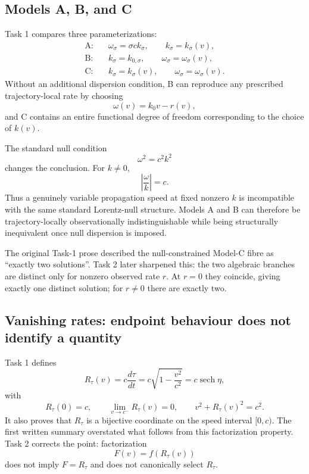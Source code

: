 \documentclass[11pt,a4paper]{article}
\newcommand{\sech}{\operatorname{sech}}
\begin{document}
\subsection{Models A, B, and C}

Task 1 compares three parameterizations:
\begin{align}
\text{A:}\quad & \omega_\sigma=\sigma ck_\sigma,\qquad k_\sigma=k_\sigma(v),\\
\text{B:}\quad & k_\sigma=k_{0,\sigma},\qquad \omega_\sigma=\omega_\sigma(v),\\
\text{C:}\quad & k_\sigma=k_\sigma(v),\qquad \omega_\sigma=\omega_\sigma(v).
\end{align}
Without an additional dispersion condition, B can reproduce any prescribed trajectory-local rate by choosing
\begin{equation}
 \omega(v)=k_0v-r(v),
\end{equation}
and C contains an entire functional degree of freedom corresponding to the choice of $k(v)$.

The standard null condition
\begin{equation}
 \omega^2=c^2k^2
\label{eq:dispersion}
\end{equation}
changes the conclusion.  For $k\neq0$,
\begin{equation}
 \left|\frac{\omega}{k}\right|=c.
\end{equation}
Thus a genuinely variable propagation speed at fixed nonzero $k$ is incompatible with the same standard Lorentz-null structure.  Models A and B can therefore be trajectory-locally observationally indistinguishable while being structurally inequivalent once null dispersion is imposed.

The original Task-1 prose described the null-constrained Model-C fibre as ``exactly two solutions''.  Task 2 later sharpened this: the two algebraic branches are distinct only for nonzero observed rate $r$.  At $r=0$ they coincide, giving exactly one distinct solution; for $r\neq0$ there are exactly two.

\subsection{Vanishing rates: endpoint behaviour does not identify a quantity}

Task 1 defines
\begin{equation}
 R_\tau(v)=c\frac{d\tau}{dt}=c\sqrt{1-\frac{v^2}{c^2}}=c\sech\eta,
\end{equation}
with
\begin{equation}
 R_\tau(0)=c,
 \qquad
 \lim_{v\to c^-}R_\tau(v)=0,
 \qquad
 v^2+R_\tau(v)^2=c^2.
\end{equation}
It also proves that $R_\tau$ is a bijective coordinate on the speed interval $[0,c)$.  The first written summary overstated what follows from this factorization property.  Task 2 corrects the point: factorization
\begin{equation}
 F(v)=f(R_\tau(v))
\end{equation}
does not imply $F=R_\tau$ and does not canonically select $R_\tau$.
\end{document}
